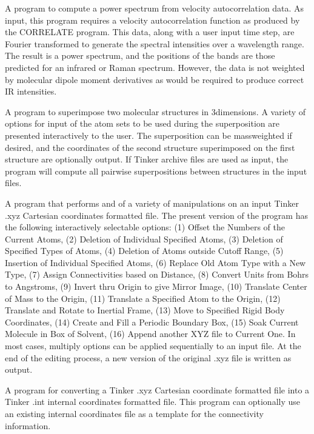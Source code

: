 \documentclass[letterpaper,11pt,english]{sphinxmanual}
\begin{document}

A program to compute a power spectrum from velocity autocorrelation data. As input, this program requires a velocity autocorrelation function as produced by the CORRELATE program. This data, along with a user input time step, are Fourier transformed to generate the spectral intensities over a wavelength range. The result is a power spectrum, and the positions of the bands are those predicted for an infrared or Raman spectrum. However, the data is not weighted by molecular dipole moment derivatives as would be required to produce correct IR intensities.


A program to superimpose two molecular structures in 3\sphinxhyphen{}dimensions. A variety of options for input of the atom sets to be used during the superposition are presented interactively to the user. The superposition can be mass\sphinxhyphen{}weighted if desired, and the coordinates of the second structure superimposed on the first structure are optionally output. If Tinker archive files are used as input, the program will compute all pairwise superpositions between structures in the input files.


A program that performs and of a variety of manipulations on an input Tinker .xyz Cartesian coordinates formatted file. The present version of the program has the following interactively selectable options: (1) Offset the Numbers of the Current Atoms, (2) Deletion of Individual Specified Atoms, (3) Deletion of Specified Types of Atoms, (4) Deletion of Atoms outside Cutoff Range, (5) Insertion of Individual Specified Atoms, (6) Replace Old Atom Type with a New Type, (7) Assign Connectivities based on Distance, (8) Convert Units from Bohrs to Angstroms, (9) Invert thru Origin to give Mirror Image, (10) Translate Center of Mass to the Origin, (11) Translate a Specified Atom to the Origin, (12) Translate and Rotate to Inertial Frame, (13) Move to Specified Rigid Body Coordinates, (14) Create and Fill a Periodic Boundary Box, (15) Soak Current Molecule in Box of Solvent, (16) Append another XYZ file to Current One. In most cases, multiply options can be applied sequentially to an input file. At the end of the editing process, a new version of the original .xyz file is written as output.


A program for converting a Tinker .xyz Cartesian coordinate formatted file into a Tinker .int internal coordinates formatted file. This program can optionally use an existing internal coordinates file as a template for the connectivity information.
\end{document}
